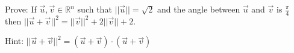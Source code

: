 
\begin{Exercise}[
name={},
title={}, 
difficulty=0,
origin={\cite{YL}}]
Prove: If $\vec{u}, \vec{v}\in \mathbb{R}^n$ such that $||\vec{u}||=\sqrt{2}$ and the angle between $\vec{u}$ and $\vec{v}$ is $\frac{\pi}{4}$ then $||\vec{u}+\vec{v}||^2=||\vec{v}||^2+2||\vec{v}||+2$.
\end{Exercise}

\begin{Answer}
Hint: $||\vec{u}+\vec{v}||^2=(\vec{u}+\vec{v})\cdot(\vec{u}+\vec{v})$
\end{Answer}
